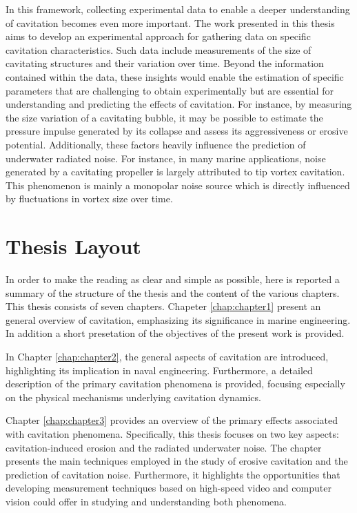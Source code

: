 In this framework, collecting experimental data to enable a deeper understanding of cavitation becomes even more important. The work presented in this thesis aims to develop an experimental approach for gathering data on specific cavitation characteristics. Such data include measurements of the size of cavitating structures and their variation over time. 
Beyond the information contained within the data, these insights would enable the estimation of specific parameters that are challenging to obtain experimentally but are essential for understanding and predicting the effects of cavitation. 
For instance, by measuring the size variation of a cavitating bubble, it may be possible to estimate the pressure impulse generated by its collapse and assess its aggressiveness or erosive potential.
Additionally, these factors heavily influence the prediction of underwater radiated noise. For instance, in many marine applications, noise generated by a cavitating propeller is largely attributed to tip vortex cavitation. This phenomenon is mainly a monopolar noise source which is directly influenced by fluctuations in vortex size over time. 

\section{Thesis Layout}

In order to make the reading as clear and simple as possible, here is reported a summary of the structure of the thesis and the content of the various chapters. This thesis consists of seven chapters. Chapeter \ref{chap:chapter1} present an general overview of cavitation, emphasizing its significance in marine engineering. In addition a short presetation of the objectives of the present work is provided.

In Chapter \ref{chap:chapter2}, the general aspects of cavitation are introduced, highlighting its implication in naval engineering. Furthermore, a detailed description of the primary cavitation phenomena is provided, focusing especially on the physical mechanisms underlying cavitation dynamics.

Chapter \ref{chap:chapter3} provides an overview of the primary effects associated with cavitation phenomena. Specifically, this thesis focuses on two key aspects: cavitation-induced erosion and the radiated underwater noise. The chapter presents the main techniques employed in the study of erosive cavitation and the prediction of cavitation noise. Furthermore, it highlights the opportunities that developing measurement techniques based on high-speed video and computer vision could offer in studying and understanding both phenomena.

